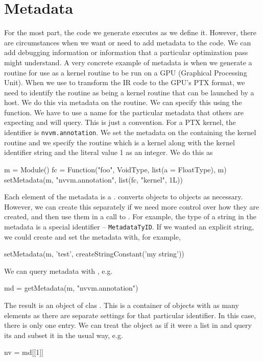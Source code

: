 \documentclass[article]{jss}
\begin{document}

\section{Metadata}
For the most part, the code we generate executes as we define it.
However, there are circumstances when we want or need to add metadata
to the code.  We can add debugging information or information that a
particular optimization pass might understand.  A very concrete
example of metadata is when we generate a routine for use as a kernel
routine to be run on a GPU (Graphical Processing Unit).
When we use  to transform the \llvm{} IR code to 
the GPU's PTX format, we need to identify the routine as being a
kernel routine that can be launched by a host. 
We do this via metadata on the routine.
We can specify this using the  function.
We have to use a name for the particular metadata that others are
expecting and will query.  This is just a convention.
For a PTX kernel, the identifier is \texttt{nvvm.annotation}.
We set the metadata on the  containing the 
kernel routine and we specify the routine which is a kernel
along with the kernel identifier string and the literal value 1 as an
integer.
We do this as
\begin{RCode}
m = Module()
fc = Function("foo", VoidType, list(a = FloatType), m)
setMetadata(m, "nvvm.annotation", list(fc, "kernel", 1L))
\end{RCode}
Each element of the metadata is a .
 converts \R{} objects to 
objects as necessary. However, we can create this separately
if we need more control over how they are created,
and then use them in a call to .
For example, the type of a string in the metadata 
is a special identifier -- \texttt{MetadataTyID}.
If we wanted an explicit string, we could create and set the metadata
with, for example,
\begin{RCode}
setMetadata(m, 'test', createStringConstant('my string'))
\end{RCode}

We can query metadata with , e.g. 
\begin{RCode}
md = getMetadata(m, "nvvm.annotation")
\end{RCode}
The result is an object of clas .
This is a container of  objects
with as many elements as there are separate settings
for that particular identifier. In this case, there
is only one entry.
We can treat the  object as if it were a list in
\R{} and query its  and subset it in the usual way, e.g.
\begin{RCode}
nv = md[[1]]
\end{RCode}
\end{document}
